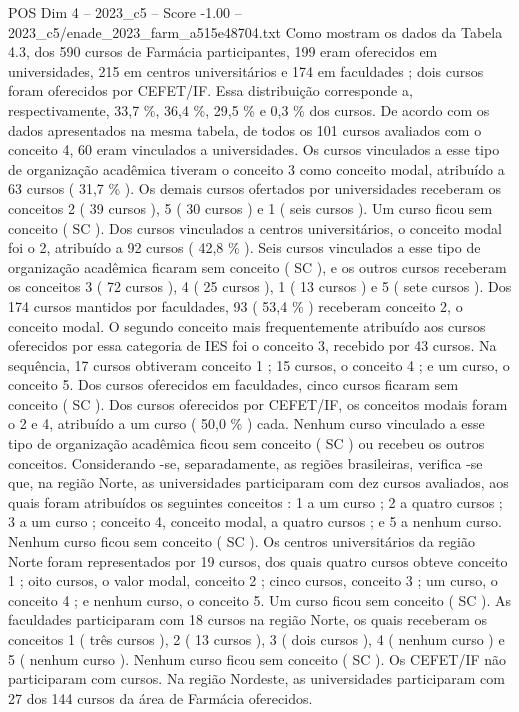 \begin{textsample}{POS Dim 4 – 2023\_c5 – Score -1.00 – 2023\_c5/enade\_2023\_farm\_a515e48704.txt}
Como mostram os dados da Tabela 4.3, dos 590 cursos de Farmácia participantes, 199 eram oferecidos em universidades, 215 em centros universitários e 174 em faculdades ; dois cursos foram oferecidos por CEFET/IF.
Essa distribuição corresponde a, respectivamente, 33,7 \%, 36,4 \%, 29,5 \% e 0,3 \% dos cursos.
De acordo com os dados apresentados na mesma tabela, de todos os 101 cursos avaliados com o conceito 4, 60 eram vinculados a universidades.
Os cursos vinculados a esse tipo de organização acadêmica tiveram o conceito 3 como conceito modal, atribuído a 63 cursos ( 31,7 \% ).
Os demais cursos ofertados por universidades receberam os conceitos 2 ( 39 cursos ), 5 ( 30 cursos ) e 1 ( seis cursos ).
Um curso ficou sem conceito ( SC ).
Dos cursos vinculados a centros universitários, o conceito modal foi o 2, atribuído a 92 cursos ( 42,8 \% ).
Seis cursos vinculados a esse tipo de organização acadêmica ficaram sem conceito ( SC ), e os outros cursos receberam os conceitos 3 ( 72 cursos ), 4 ( 25 cursos ), 1 ( 13 cursos ) e 5 ( sete cursos ).
Dos 174 cursos mantidos por faculdades, 93 ( 53,4 \% ) receberam conceito 2, o conceito modal.
O segundo conceito mais frequentemente atribuído aos cursos oferecidos por essa categoria de IES foi o conceito 3, recebido por 43 cursos.
Na sequência, 17 cursos obtiveram conceito 1 ; 15 cursos, o conceito 4 ; e um curso, o conceito 5.
Dos cursos oferecidos em faculdades, cinco cursos ficaram sem conceito ( SC ).
Dos cursos oferecidos por CEFET/IF, os conceitos modais foram o 2 e 4, atribuído a um curso ( 50,0 \% ) cada.
Nenhum curso vinculado a esse tipo de organização acadêmica ficou sem conceito ( SC ) ou recebeu os outros conceitos.
Considerando -se, separadamente, as regiões brasileiras, verifica -se que, na região Norte, as universidades participaram com dez cursos avaliados, aos quais foram atribuídos os seguintes conceitos : 1 a um curso ; 2 a quatro cursos ; 3 a um curso ; conceito 4, conceito modal, a quatro cursos ; e 5 a nenhum curso.
Nenhum curso ficou sem conceito ( SC ).
Os centros universitários da região Norte foram representados por 19 cursos, dos quais quatro cursos obteve conceito 1 ; oito cursos, o valor modal, conceito 2 ; cinco cursos, conceito 3 ; um curso, o conceito 4 ; e nenhum curso, o conceito 5.
Um curso ficou sem conceito ( SC ).
As faculdades participaram com 18 cursos na região Norte, os quais receberam os conceitos 1 ( três cursos ), 2 ( 13 cursos ), 3 ( dois cursos ), 4 ( nenhum curso ) e 5 ( nenhum curso ).
Nenhum curso ficou sem conceito ( SC ).
Os CEFET/IF não participaram com cursos.
Na região Nordeste, as universidades participaram com 27 dos 144 cursos da área de Farmácia oferecidos.

\end{textsample}
